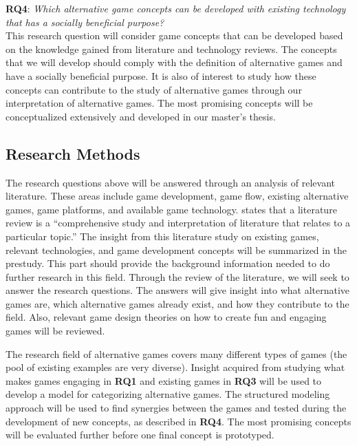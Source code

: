 \documentclass[../Main.tex]{subfiles}
\begin{document}
\textbf{RQ4}: \textit{Which alternative game concepts can be developed with existing technology that has a socially beneficial purpose?} \\
This research question will consider game concepts that can be developed based on the knowledge gained from literature and technology reviews. The concepts that we will develop should comply with the definition of alternative games and have a socially beneficial purpose. It is also of interest to study how these concepts can contribute to the study of alternative games through our interpretation of alternative games. The most promising concepts will be conceptualized extensively and developed in our master's thesis. 

\subsection{Research Methods}
The research questions above will be answered through an analysis of relevant literature. These areas include game development, game flow, existing alternative games, game platforms, and available game technology. \citet{aveyard_doing_2014} states that a literature review is a “comprehensive study and interpretation of literature that relates to a particular topic.” The insight from this literature study on existing games, relevant technologies, and game development concepts will be summarized in the prestudy. This part should provide the background information needed to do further research in this field. Through the review of the literature, we will seek to answer the research questions. The answers will give insight into what alternative games are, which alternative games already exist, and how they contribute to the field. Also, relevant game design theories on how to create fun and engaging games will be reviewed. 

The research field of alternative games covers many different types of games (the pool of existing examples are very diverse). Insight acquired from studying what makes games engaging in \textbf{RQ1} and existing games in \textbf{RQ3} will be used to develop a model for categorizing alternative games. The structured modeling approach will be used to find synergies between the games and tested during the development of new concepts, as described in \textbf{RQ4}. The most promising concepts will be evaluated further before one final concept is prototyped.



\biblio %
\end{document}
